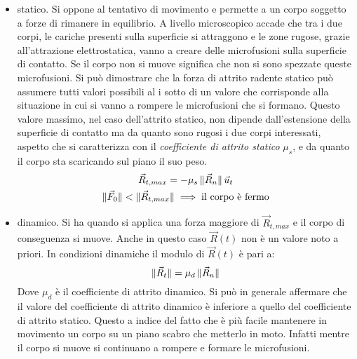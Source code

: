 \documentclass[10pt,a4paper]{book}
\DeclarePairedDelimiter{\norma}{\lVert}{\rVert} %
\begin{document}
\begin{itemize}
	\item statico. Si oppone al tentativo di movimento e permette a un corpo soggetto a forze di rimanere in equilibrio. A livello microscopico accade che tra i due corpi, le cariche presenti sulla superficie si attraggono e le zone rugose, grazie all'attrazione elettrostatica, vanno a creare delle microfusioni sulla superficie di contatto. Se il corpo non si muove significa che non si sono spezzate queste microfusioni. Si può dimostrare che la forza di attrito radente statico può assumere tutti valori possibili al i sotto di un valore che corrisponde alla situazione in cui si vanno a rompere le microfusioni che si formano. Questo valore massimo, nel caso dell'attrito statico, non dipende dall'estensione della superficie di contatto ma da quanto sono rugosi i due corpi interessati, aspetto che si caratterizza con il \emph{coefficiente di attrito statico} $\mu_s$, e da quanto il corpo sta scaricando sul piano il suo peso.
	\begin{gather*}
		\vec{R}_{t, max}=-\mu_s\,\norma{\vec{R}_n}\,\vec{u}_t \\
		\norma{\vec{F}_0}<\norma{\vec{R}_{t, max}} \implies \text{il corpo è fermo}
	\end{gather*}
	\item dinamico. Si ha quando si applica una forza maggiore di $\vec{R}_{t, max}$ e il corpo di conseguenza si muove. Anche in questo caso $\vec{R}(t)$ non è un valore noto a priori. In condizioni dinamiche il modulo di $\vec{R}(t)$ è pari a:
	\[
		\norma{\vec{R}_t}=\mu_d\,\norma{\vec{R}_{n}}
	\]
	Dove $\mu_d$ è il coefficiente di attrito dinamico. Si può in generale affermare che il valore del coefficiente di attrito dinamico è inferiore a quello del coefficiente di attrito statico. Questo a indice del fatto che è più facile mantenere in movimento un corpo su un piano scabro che metterlo in moto. Infatti mentre il corpo si muove si continuano a rompere e formare le microfusioni.
\end{itemize}
\end{document}
